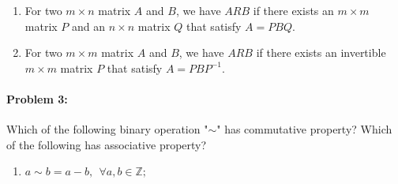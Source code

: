 \documentclass[12pt]{scrartcl}
\begin{document}
{{\begin{enumerate}[label=\textbf{\arabic*)}]
{\begin{minipage}{0.9\textwidth}
		~~~Symmetric Property: $$A=PBQ \Longrightarrow B=PAQ$$
	
		~~~Transitive Property: $$B=PAQ, C=PBQ \Longrightarrow C=PAQ$$
	\end{minipage}}

	\item For two $m \times n$ matrix $A$ and $B$, we have $ARB$ if there exists an $m \times m$ matrix $P$ and an $n \times n$ matrix $Q$ that satisfy $A=PBQ$.


	\item For two $m \times m$ matrix $A$ and $B$, we have $ARB$ if there exists an invertible $m \times m$ matrix $P$ that satisfy $A=PBP^{-1}$.


	\end{enumerate}

\newpage

\paragraph*{Problem 3: } Which of the following binary operation "$\sim$" has commutative property? Which of the following has associative property?

	\begin{enumerate}[label=\arabic*)]

	\item $a \sim b = a - b, ~~\forall a, b \in \mathbb{Z};$


\end{enumerate}}}
\end{document}
